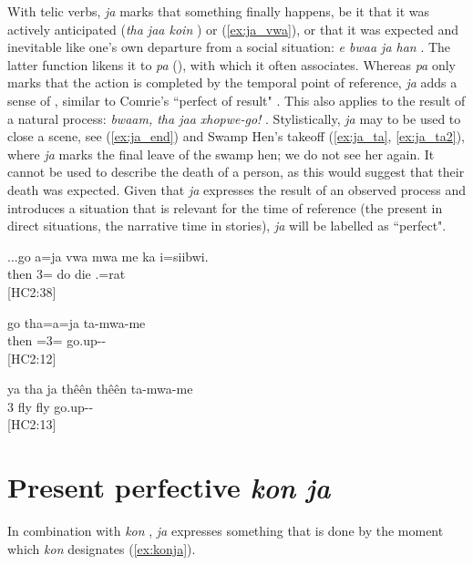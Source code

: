 With telic verbs, \textit{ja} marks that something finally happens, be it that it was actively anticipated (\textit{tha jaa koin} ) or (\ref{ex:ja_vwa}), or that it was expected and inevitable like one's own departure from a social situation: \textit{e bwaa ja han} . The latter function likens it to \textit{pa} (), with which it often associates. Whereas \textit{pa} only marks that the action is completed by the temporal point of reference, \textit{ja} adds a sense of , similar to Comrie's ``perfect of result" \parencite[58]{comrie_aspect_1981}. This also applies to the result of a natural process: \textit{bwaam, tha jaa xhopwe-go!} . Stylistically, \textit{ja} may to be used to close a scene, see (\ref{ex:ja_end}) and Swamp Hen's takeoff (\ref{ex:ja_ta}, \ref{ex:ja_ta2}), where \textit{ja} marks the final leave of the swamp hen; we do not see her again. It cannot be used to describe the death of a person, as this would suggest that their death was expected. Given that \textit{ja} expresses the result of an observed process and introduces a situation that is relevant for the time of reference (the present in direct situations, the narrative time in stories), \textit{ja} will be labelled as ``perfect". 


\ea\label{ex:ja_vwa}
\gll ...go a={ja} vwa mwa me ka i=siibwi.\\
 then 3= do  die  .=rat\\
\glt {} {[HC2:38]}%
\z 

\ea\label{ex:ja_ta}
\gll go tha=a={ja} ta-mwa-me\\
 then =3= go.up--\\
\glt {} {[HC2:12]} 
\z

\ea\label{ex:ja_ta2}
\gll ya tha {ja} thêên thêên ta-mwa-me\\
 3   fly fly go.up--\\
\glt {} {[HC2:13]} 
\z

\section{Present perfective \textit{kon ja}}
In combination with \textit{kon} , \textit{ja} expresses something that is done by the moment which \textit{kon} designates (\ref{ex:konja}). 

